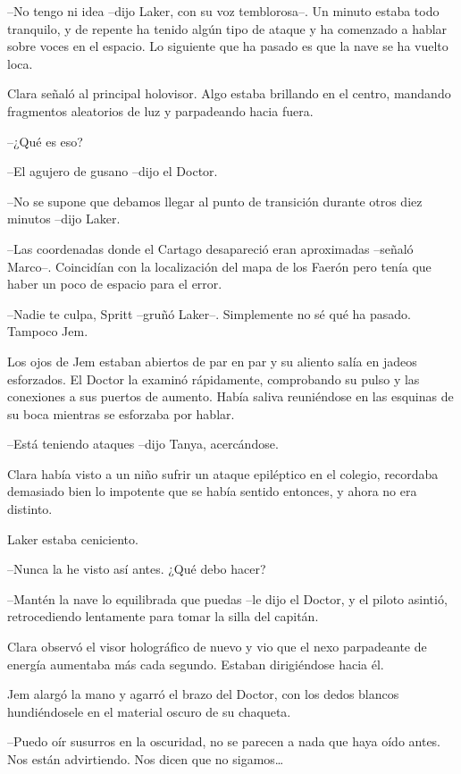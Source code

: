{--No tengo ni idea --dijo Laker, con su voz temblorosa--. Un minuto
 estaba todo tranquilo, y de repente ha tenido algún tipo de ataque y ha
 comenzado a hablar sobre voces en el espacio. Lo siguiente que ha pasado
es que la nave se ha vuelto loca.}

{Clara señaló al principal holovisor. Algo estaba brillando en el centro,
mandando fragmentos aleatorios de luz y parpadeando hacia fuera.}

{--¿Qué es eso?}

{--El agujero de gusano --dijo el Doctor.}

{--No se supone que debamos llegar al punto de transición durante otros
diez minutos --dijo Laker.}

{--Las coordenadas donde el Cartago desapareció eran aproximadas --señaló
 Marco--. Coincidían con la localización del mapa de los Faerón pero
tenía que haber un poco de espacio para el error.}

{--Nadie te culpa, Spritt --gruñó Laker--. Simplemente no sé qué ha
pasado. Tampoco Jem.}

{Los ojos de Jem estaban abiertos de par en par y su aliento salía en
 jadeos esforzados. El Doctor la examinó rápidamente, comprobando su
 pulso y las conexiones a sus puertos de aumento. Había saliva
 reuniéndose en las esquinas de su boca mientras se esforzaba por
hablar.}

{--Está teniendo ataques --dijo Tanya, acercándose.}

{Clara había visto a un niño sufrir un ataque epiléptico en el colegio,
 recordaba demasiado bien lo impotente que se había sentido entonces, y
ahora no era distinto.}

{Laker estaba ceniciento.}

{--Nunca la he visto así antes. ¿Qué debo hacer?}

{--Mantén la nave lo equilibrada que puedas --le dijo el Doctor, y el
 piloto asintió, retrocediendo lentamente para tomar la silla del
capitán.}

{Clara observó el visor holográfico de nuevo y vio que el nexo
 parpadeante de energía aumentaba más cada segundo. Estaban dirigiéndose
hacia él.}

{Jem alargó la mano y agarró el brazo del Doctor, con los dedos blancos
hundiéndosele en el material oscuro de su chaqueta.}

{--Puedo oír susurros en la oscuridad, no se parecen a nada que haya oído
 antes. Nos están advirtiendo. Nos dicen que no sigamos\ldots{}}

